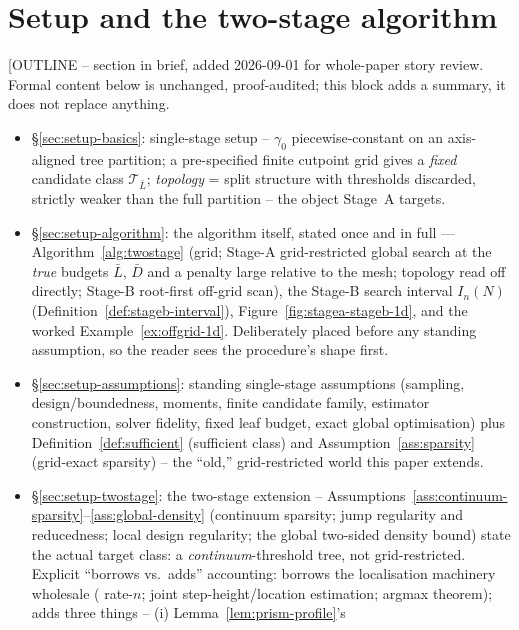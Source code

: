 \documentclass[11pt]{article}
\theoremstyle{plain}
\theoremstyle{definition}
\theoremstyle{remark}
\newcommand{\cT}{\mathcal{T}}
\begin{document}
\section{Setup and the two-stage algorithm}\label{sec:setup}

[OUTLINE -- section in brief, added 2026-09-01 for whole-paper story
review. Formal content below is unchanged, proof-audited; this block adds
a summary, it does not replace anything.
\begin{itemize}
\item \S\ref{sec:setup-basics}: single-stage setup -- $\gamma_0$
  piecewise-constant on an axis-aligned tree partition; a pre-specified
  finite cutpoint grid gives a \emph{fixed} candidate class $\cT_{\bar L}$;
  \emph{topology} = split structure with thresholds discarded, strictly
  weaker than the full partition -- the object Stage~A targets.
\item \S\ref{sec:setup-algorithm}: the algorithm itself, stated once and in
  full --- Algorithm~\ref{alg:twostage} (grid; Stage-A grid-restricted global
  search at the \emph{true} budgets $\bar L$, $\bar D$ and a penalty large
  relative to the mesh; topology read off directly; Stage-B
  root-first off-grid scan), the Stage-B search interval
  $I_n(N)$ (Definition~\ref{def:stageb-interval}),
  Figure~\ref{fig:stagea-stageb-1d}, and the worked
  Example~\ref{ex:offgrid-1d}. Deliberately placed before any standing
  assumption, so the reader sees the procedure's shape first.
\item \S\ref{sec:setup-assumptions}: standing single-stage assumptions
  (sampling, design/boundedness, moments, finite candidate family,
  estimator construction, solver fidelity, fixed leaf budget, exact global
  optimisation) plus Definition~\ref{def:sufficient} (sufficient class) and
  Assumption~\ref{ass:sparsity} (grid-exact sparsity) -- the ``old,''
  grid-restricted world this paper extends.
\item \S\ref{sec:setup-twostage}: the two-stage extension --
  Assumptions~\ref{ass:continuum-sparsity}--\ref{ass:global-density}
  (continuum sparsity; jump regularity and reducedness; local design
  regularity; the global two-sided density bound)
  state the actual target class: a \emph{continuum}-threshold
  tree, not grid-restricted. Explicit ``borrows vs.\ adds'' accounting:
  borrows the localisation machinery wholesale (\citealt{chan1993,
  seijosen2011} rate-$n$; \citealt{baiperron1998,yaoau1989,boysen2009}
  joint step-height/location estimation; \citealt{seootsu2018} argmax
  theorem); adds three things -- (i) Lemma~\ref{lem:prism-profile}'s

\end{itemize}
\end{document}
